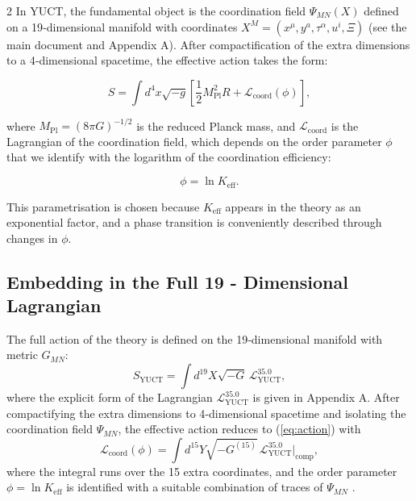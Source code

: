 \documentclass[12pt,a4paper]{article}
\newcommand{\Keff}{K_{\mathrm{eff}}}
\newcommand{\Mpl}{M_{\mathrm{Pl}}}
\begin{document}
\begin{multicols}{2}
		In YUCT, the fundamental object is the coordination field \(\Psi_{MN}(X)\) defined on a 19‑dimensional manifold with coordinates \(X^M = (x^\mu, y^a, \tau^\alpha, u^i, \Xi)\) (see the main document and Appendix A). After compactification of the extra dimensions to a 4‑dimensional spacetime, the effective action takes the form:
		
		\begin{equation}
			S = \int d^4x \sqrt{-g} \left[ \frac{1}{2} \Mpl^2 R + \mathcal{L}_{\mathrm{coord}}(\phi) \right],
			\label{eq:action}
		\end{equation}
		
		where \(\Mpl = (8\pi G)^{-1/2}\) is the reduced Planck mass, and \(\mathcal{L}_{\mathrm{coord}}\) is the Lagrangian of the coordination field, which depends on the order parameter \(\phi\) that we identify with the logarithm of the coordination efficiency:
		
		\begin{equation}
			\phi = \ln \Keff.
			\label{eq:phi-def}
		\end{equation}
		
		This parametrisation is chosen because \(\Keff\) appears in the theory as an exponential factor, and a phase transition is conveniently described through changes in \(\phi\).
		
		\subsection{Embedding in the Full 19 - Dimensional Lagrangian}
		
		The full action of the theory is defined on the 19‑dimensional manifold with metric \(G_{MN}\):
		\begin{equation}
			S_{\text{YUCT}} = \int d^{19}X \sqrt{-G} \, \mathcal{L}_{\text{YUCT}}^{35.0},
			\label{eq:full-action}
		\end{equation}
		where the explicit form of the Lagrangian \(\mathcal{L}_{\text{YUCT}}^{35.0}\) is given in Appendix A. After compactifying the extra dimensions to 4‑dimensional spacetime and isolating the coordination field \(\Psi_{MN}\), the effective action reduces to (\ref{eq:action}) with
		\begin{equation}
			\mathcal{L}_{\mathrm{coord}}(\phi) = \int d^{15}Y \sqrt{-G^{(15)}} \, \mathcal{L}_{\text{YUCT}}^{35.0}\big|_{\text{comp}},
		\end{equation}
		where the integral runs over the 15 extra coordinates, and the order parameter \(\phi = \ln\Keff\) is identified with a suitable combination of traces of \(\Psi_{MN}\) \cite{Yakushev2026}.
		

\end{multicols}
\end{document}
